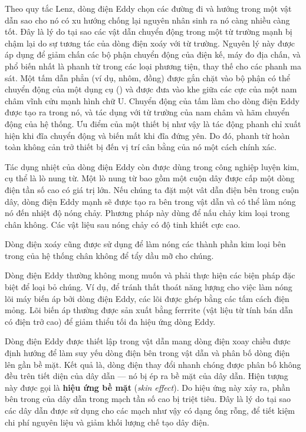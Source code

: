 Theo quy tắc Lenz, dòng điện Eddy chọn các đường đi và hướng trong một vật dẫn sao cho nó có xu hướng chống lại nguyên nhân sinh ra nó càng nhiều càng tốt.
Đây là lý do tại sao các vật dẫn chuyển động trong một từ trường mạnh bị chậm lại do sự tương tác của dòng điện xoáy với từ trường.
Nguyên lý này được áp dụng để giảm chấn các bộ phận chuyển động của điện kế, máy đo địa chấn, và phổ biến nhất là phanh từ trong các loại phương tiện, thay thế cho các phanh ma sát.
Một tấm dẫn phẳn (ví dụ, nhôm, đồng) được gắn chặt vào bộ phận có thể chuyển động của một dụng cụ () và được đưa vào khe giữa các cực của một nam châm vĩnh cửu mạnh hình chữ U.
Chuyển động của tấm làm cho dòng điện Eddy được tạo ra trong nó, và tác dụng với từ trường của nam châm và hãm chuyển động của hệ thống.
Ưu điểm của một thiết bị như vậy là tác động phanh chỉ xuất hiện khi đĩa chuyển động và biến mất khi đĩa đứng yên.
Do đó, phanh từ hoàn toàn không cản trở thiết bị đến vị trí cân bằng của nó một cách chính xác.

Tác dụng nhiệt của dòng điện Eddy còn được dùng trong công nghiệp luyện kim, cụ thể là lò nung từ.
 Một lò nung từ bao gồm một cuộn dây được cấp một dòng điện tần số cao có giá trị lớn.
Nếu chúng ta đặt một vât dẫn điện bên trong cuộn dây, dòng điện Eddy mạnh sẽ được tạo ra bên trong vật dẫn và
có thể làm nóng nó đến nhiệt độ nóng chảy.
Phương pháp này dùng để nấu chảy kim loại trong chân không.
Các vật liệu sau nóng chảy có độ tinh khiết cực cao.

Dòng điện xoáy cũng được sử dụng để làm nóng các thành phần kim loại bên trong của hệ thống chân không để tẩy dầu mỡ cho chúng.

Dòng điện Eddy thường không mong muốn và phải thực hiện các biện pháp đặc biệt để loại bỏ chúng.
Ví dụ, để tránh thất thoát năng lượng cho việc làm nóng lõi máy biến áp bởi dòng điện Eddy, các lõi được ghép bằng các tấm cách điện mỏng. Lõi biến áp thường được sản xuất bằng ferrrite (vật liệu từ tính bán dẫn có điện trở cao) để giảm thiểu tối đa hiệu ứng dòng Eddy.

Dòng điện Eddy được thiết lập trong vật dẫn mang dòng điện xoay chiều được định hướng để làm suy yếu dòng điện bên trong vật dẫn và phân bố dòng điện lên gần bề mặt.
Kết quả là, dòng điện thay đổi nhanh chóng được phân bố
không đều trên tiết diện của dây dẫn --- nó bị ép ra bề mặt của dây dẫn.
Hiện tượng này được gọi là \textbf{hiệu ứng bề mặt} (\textit{skin effect}).
Do hiệu ứng này xảy ra, phần bên trong của dây dẫn trong mạch tần số cao bị triệt tiêu. Đây là lý do tại sao các dây dẫn được sử dụng cho các mạch như vậy có dạng ống rỗng, để tiết kiệm chi phí nguyên liệu và giảm khối lượng chế tạo dây điện.

